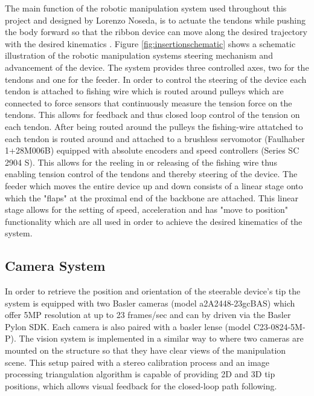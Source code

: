 The main function of the robotic manipulation system used throughout this project and designed by Lorenzo Noseda, is to actuate the tendons while pushing the body forward so that the ribbon device can move along the desired trajectory with the desired kinematics \cite{noseda_flat_2024}. 
\newline \newline
Figure \ref{fig:insertionschematic} shows a schematic illustration of the robotic manipulation systems steering mechanism and advancement of the device. The system provides three controlled axes, two for the tendons and one for the feeder. 
\newline \newline 
In order to control the steering of the device each tendon is attached to fishing wire which is routed around pulleys which are connected to force sensors  that continuously measure the tension force on the tendons. This allows for feedback and thus closed loop control of the tension on each tendon. After being routed around the pulleys the fishing-wire attatched to each tendon is routed around and attached to a brushless servomotor (Faulhaber 1+28M006B) equipped with absolute encoders and speed controllers (Series SC 2904 S). This allows for the reeling in or releasing of the fishing wire thus enabling tension control of the tendons and thereby steering of the device. 
\newline \newline
The feeder which moves the entire device up and down consists of a linear stage  onto which the "flaps" at the proximal end of the backbone are attached. This linear stage allows for the setting of speed, acceleration and has "move to position" functionality which are all used in order to achieve the desired kinematics of the system.


\subsection{Camera System}
In order to retrieve the position and orientation of the steerable device's tip the system is equipped with two Basler cameras (model a2A2448-23gcBAS) which offer 5MP resolution at up to 23 frames/sec and can by driven via the Basler Pylon SDK. Each camera is also paired with a basler lense (model C23-0824-5M-P). The vision system is implemented in a similar way to \cite{dalvand_high_2016} where two cameras are mounted on the structure so that they have clear views of the manipulation scene. This setup paired with a stereo calibration process and an image processing triangulation algorithm is capable of providing 2D and 3D tip positions, which allows visual feedback for the closed-loop path following.

